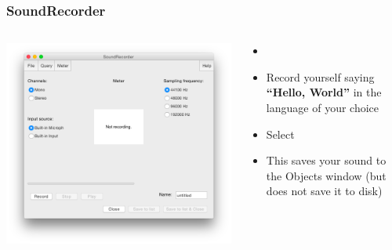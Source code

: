 \documentclass[handout]{beamer}
\begin{document}
\begin{frame}[fragile]
\frametitle{SoundRecorder}
    
\begin{columns}[]
  \begin{column}{0.5\textwidth}
    \includegraphics[width=\textwidth]{graphics/soundrecorder.png}
  \end{column}

  \begin{column}{0.5\textwidth}
    \begin{itemize}
        \item <1->
        \item <1--> Record yourself saying \textbf{``Hello, World''} in the language of your choice
        \item <2-> Select 
        \item <3-> This saves your sound to the Objects window (but does not save it to disk)
    \end{itemize}
  \end{column}
\end{columns}

\end{frame}
\end{document}
